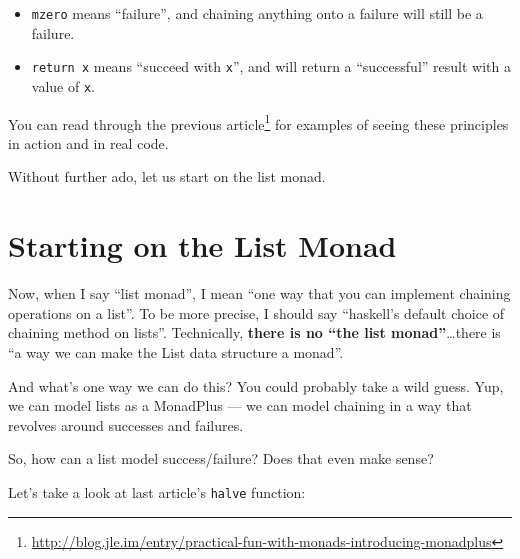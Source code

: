 \documentclass[]{article}
\newenvironment{Shaded}{}{}
\newcommand{\CommentTok}[1]{\textcolor[rgb]{0.38,0.63,0.69}{\textit{#1}}}
\newcommand{\DataTypeTok}[1]{\textcolor[rgb]{0.56,0.13,0.00}{#1}}
\newcommand{\DecValTok}[1]{\textcolor[rgb]{0.25,0.63,0.44}{#1}}
\newcommand{\FunctionTok}[1]{\textcolor[rgb]{0.02,0.16,0.49}{#1}}
\newcommand{\KeywordTok}[1]{\textcolor[rgb]{0.00,0.44,0.13}{\textbf{#1}}}
\newcommand{\NormalTok}[1]{#1}
\newcommand{\OperatorTok}[1]{\textcolor[rgb]{0.40,0.40,0.40}{#1}}
\newcommand{\OtherTok}[1]{\textcolor[rgb]{0.00,0.44,0.13}{#1}}
\renewcommand{\href}[2]{#2\footnote{\url{#1}}}
\begin{document}
\begin{itemize}
\tightlist
\item
  \texttt{mzero} means ``failure'', and chaining anything onto a failure will
  still be a failure.
\item
  \texttt{return\ x} means ``succeed with \texttt{x}'', and will return a
  ``successful'' result with a value of \texttt{x}.
\end{itemize}

You can read through the
\href{http://blog.jle.im/entry/practical-fun-with-monads-introducing-monadplus}{previous
article} for examples of seeing these principles in action and in real code.

Without further ado, let us start on the list monad.

\section{Starting on the List Monad}\label{starting-on-the-list-monad}

Now, when I say ``list monad'', I mean ``one way that you can implement chaining
operations on a list''. To be more precise, I should say ``haskell's default
choice of chaining method on lists''. Technically, \textbf{there is no ``the
list monad''}\ldots there is ``a way we can make the List data structure a
monad''.

And what's one way we can do this? You could probably take a wild guess. Yup, we
can model lists as a MonadPlus --- we can model chaining in a way that revolves
around successes and failures.

So, how can a list model success/failure? Does that even make sense?

Let's take a look at last article's \texttt{halve} function:

\begin{Shaded}
\end{Shaded}
\end{document}
